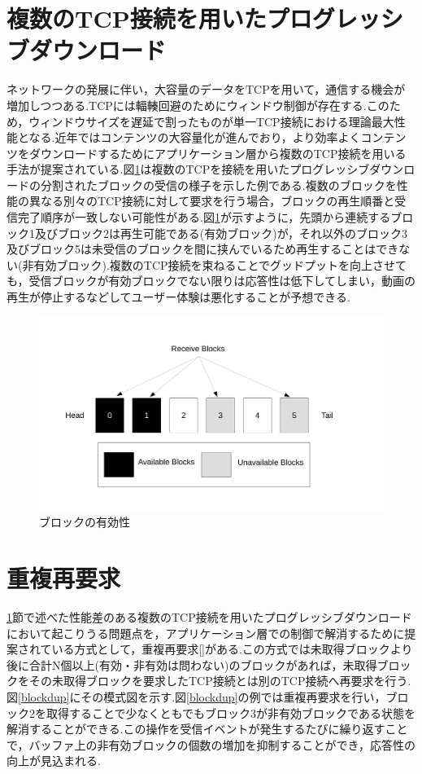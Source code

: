 \documentclass[a4j,12pt]{gradthesis_utf8}
\begin{document}
 \section{複数のTCP接続を用いたプログレッシブダウンロード}
 \label{hukusu}
 ネットワークの発展に伴い，大容量のデータをTCPを用いて，通信する機会が増加しつつある.TCPには輻輳回避のためにウィンドウ制御が存在する.このため，ウィンドウサイズを遅延で割ったものが単一TCP接続における理論最大性能となる.近年ではコンテンツの大容量化が進んでおり，より効率よくコンテンツをダウンロードするためにアプリケーション層から複数のTCP接続を用いる手法が提案されている.図\ref{block}は複数のTCPを接続を用いたプログレッシブダウンロードの分割されたブロックの受信の様子を示した例である.複数のブロックを性能の異なる別々のTCP接続に対して要求を行う場合，ブロックの再生順番と受信完了順序が一致しない可能性がある.図\ref{block}が示すように，先頭から連続するブロック1及びブロック2は再生可能である(有効ブロック)が，それ以外のブロック3及びブロック5は未受信のブロックを間に挟んでいるため再生することはできない(非有効ブロック).複数のTCP接続を束ねることでグッドプットを向上させても，受信ブロックが有効ブロックでない限りは応答性は低下してしまい，動画の再生が停止するなどしてユーザー体験は悪化することが予想できる.
\begin{figure}[h]
\centering
\includegraphics[width=18cm]{block.pdf}
\caption{ブロックの有効性}
\label{block}
\end{figure}

 \section{重複再要求}
 \label{juhuku}
 \ref{hukusu}節で述べた性能差のある複数のTCP接続を用いたプログレッシブダウンロードにおいて起こりうる問題点を，アプリケーション層での制御で解消するために提案されている方式として，重複再要求[]がある.この方式では未取得ブロックより後に合計N個以上(有効・非有効は問わない)のブロックがあれば，未取得ブロックをその未取得ブロックを要求したTCP接続とは別のTCP接続へ再要求を行う.図\ref{blockdup}にその模式図を示す.図\ref{blockdup}の例では重複再要求を行い，ブロック2を取得することで少なくともでもブロック3が非有効ブロックである状態を解消することができる.この操作を受信イベントが発生するたびに繰り返すことで，バッファ上の非有効ブロックの個数の増加を抑制することができ，応答性の向上が見込まれる.
 
\end{document}

